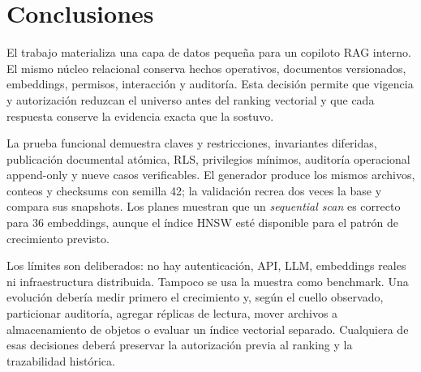 \section{Conclusiones}

El trabajo materializa una capa de datos pequeña para un copiloto RAG interno.
El mismo núcleo relacional conserva hechos operativos, documentos versionados,
embeddings, permisos, interacción y auditoría. Esta decisión permite que
vigencia y autorización reduzcan el universo antes del ranking vectorial y que
cada respuesta conserve la evidencia exacta que la sostuvo.

La prueba funcional demuestra claves y restricciones, invariantes diferidas,
publicación documental atómica, RLS, privilegios mínimos, auditoría operacional
append-only y nueve casos verificables. El generador produce los mismos
archivos, conteos y checksums con semilla 42; la validación recrea dos veces la
base y compara sus snapshots. Los planes muestran que un \textit{sequential
scan} es correcto para 36 embeddings, aunque el índice HNSW esté disponible
para el patrón de crecimiento previsto.

Los límites son deliberados: no hay autenticación, API, LLM, embeddings reales
ni infraestructura distribuida. Tampoco se usa la muestra como benchmark. Una
evolución debería medir primero el crecimiento y, según el cuello observado,
particionar auditoría, agregar réplicas de lectura, mover archivos a
almacenamiento de objetos o evaluar un índice vectorial separado. Cualquiera de
esas decisiones deberá preservar la autorización previa al ranking y la
trazabilidad histórica.
